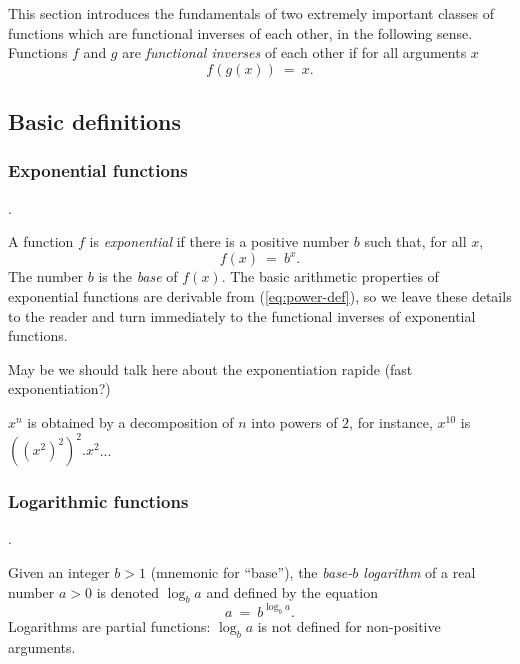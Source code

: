This section introduces the fundamentals of two extremely important
classes of functions which are functional inverses of each other, in
the following sense.  Functions $f$ and $g$ are {\it functional
  inverses} of each other if for all
arguments $x$
\begin{equation}
\label{eq:functional-inverse}
f(g(x)) \ = \ x.
\end{equation}

\subsection{Basic definitions}

\subsubsection{Exponential functions}.

A function $f$ is {\it exponential} if there is a positive number $b$
such that, for all $x$,
\begin{equation}
\label{eq:exponential-defn}
f(x) \ = \ b^x.
\end{equation}
The number $b$ is the {\it base}
%
of $f(x)$.  The basic arithmetic properties of exponential functions
are derivable from (\ref{eq:power-def}), so we leave these details to
the reader and turn immediately to the functional inverses of
exponential functions.

{\Denis May be we should talk here about the exponentiation rapide (fast exponentiation?)}
\medskip

$x^n$ is obtained by a decomposition of $n$ into powers of $2$,
for instance, $x^10$ is $((x^{2})^2)^2.x^2$...

\subsubsection{Logarithmic functions}.
\label{sec:logarithmic-fns}

Given an integer $b >1$ (mnemonic for ``base''), the {\em base-$b$
  logarithm}
%
of a real number $a > 0$ is denoted $\log_b a$ and defined by the
equation
\begin{equation}
\label{eq:logarithm-defn}
a \ = \ b^{\log_b a}.
\end{equation}
Logarithms are partial functions: $\log_b a$ is not defined for
non-positive arguments.

